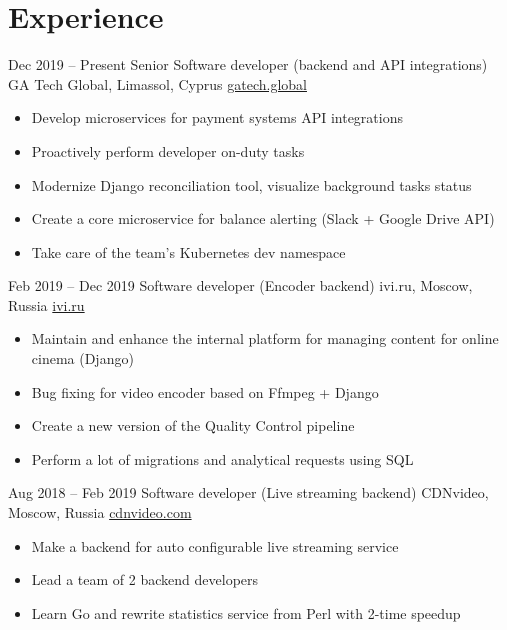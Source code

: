 \documentclass[11pt,a4paper]{moderncv}
\begin{document}
\maketitle
\vspace*{-5mm}

\section{Experience}
  \cventry
    {Dec 2019 – Present}
    {Senior Software developer (backend and API integrations)}
    {GA Tech Global, Limassol, Cyprus}
    {\url{gatech.global}}
    {}
    {
      \begin{itemize}\setlength\itemindent{6pt}
        \item Develop microservices for payment systems API integrations
        \item Proactively perform developer on-duty tasks
        \item Modernize Django reconciliation tool, visualize background tasks status
        \item Create a core microservice for balance alerting (Slack + Google Drive API)
        \item Take care of the team's Kubernetes dev namespace
      \end{itemize}
    }

  \cventry
    {Feb 2019 – Dec 2019}
    {Software developer (Encoder backend)}
    {ivi.ru, Moscow, Russia}
    {\url{ivi.ru}}
    {}
    {
      \begin{itemize}\setlength\itemindent{6pt}
        \item Maintain and enhance the internal platform for managing content for online cinema (Django)
        \item Bug fixing for video encoder based on Ffmpeg + Django
        \item Create a new version of the Quality Control pipeline
        \item Perform a lot of migrations and analytical requests using SQL
      \end{itemize}
    }

  \cventry
    {Aug 2018 – Feb 2019}
    {Software developer (Live streaming backend)}
    {CDNvideo, Moscow, Russia}
    {\url{cdnvideo.com}}
    {}
    {
      \begin{itemize}\setlength\itemindent{6pt}
        \item Make a backend for auto configurable live streaming service
        \item Lead a team of 2 backend developers
        \item Learn Go and rewrite statistics service from Perl with 2-time speedup
      \end{itemize}
    }
\end{document}
